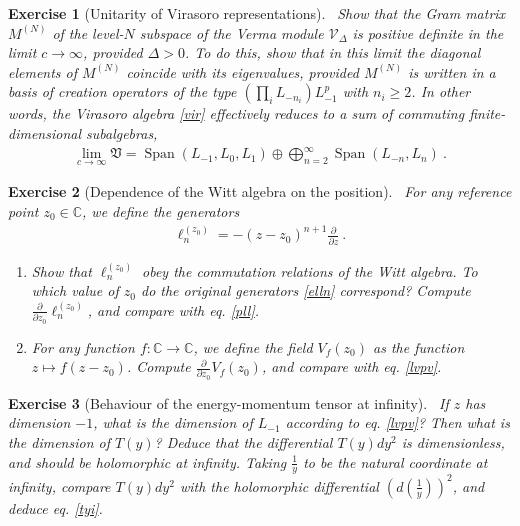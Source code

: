 \documentclass[12pt, a4paper, notitlepage, twoside]{report}
\numberwithin{equation}{section}
\theoremstyle{break}
\newtheorem{exo}{Exercise}[chapter]
\begin{document}
\begin{exo}[Unitarity of Virasoro representations]
~\label{exoun}
Show that the Gram matrix $M^{(N)}$ of the level-$N$ subspace of the Verma module $\mathcal{V}_\Delta$ is positive definite in the limit $c\to \infty$, provided  $\Delta >0$. 
To do this, show that in this limit the diagonal elements of $M^{(N)}$ coincide with its eigenvalues, provided $M^{(N)}$ is written in a basis of creation operators of the type $(\prod_i L_{-n_i}) L_{-1}^p$ with $n_i\geq 2$.
In other words, the Virasoro algebra \eqref{vir} effectively reduces to a sum of commuting finite-dimensional subalgebras, 
\begin{align}
 \underset{c\to \infty}{\lim} \mathfrak{V}  
=  \operatorname{Span}(L_{-1},L_0,L_1) \oplus \bigoplus_{n=2}^\infty \operatorname{Span} (L_{-n}, L_n)\ .
\end{align}
\end{exo}

\begin{exo}[Dependence of the Witt algebra on the position]
 ~\label{exowitt}
For any reference point $z_0\in\mathbb{C}$, we define the generators
\begin{align}
 \ell_n^{(z_0)} = -(z-z_0)^{n+1}{\frac{\partial}{\partial z}}\ .
\end{align}
\begin{enumerate}
 \item Show that $\ell_n^{(z_0)}$ obey the commutation relations of the Witt algebra. To which value of $z_0$ do the original generators \eqref{elln} correspond?
Compute $\frac{\partial}{\partial z_0} \ell_n^{(z_0)}$, and compare with eq. \eqref{pll}.
\item For any function $f:\mathbb{C}\to \mathbb{C}$, we define the field $V_f(z_0)$ as the function $z\mapsto f(z-z_0)$. Compute $\frac{\partial}{\partial z_0} V_f(z_0)$, and compare with eq. \eqref{lvpv}.
\end{enumerate}
\end{exo}

\begin{exo}[Behaviour of the energy-momentum tensor at infinity]
 ~\label{exoti}
 If $z$ has dimension $-1$, what is the dimension of $L_{-1}$ according to eq. \eqref{lvpv}? Then what is the dimension of $T(y)$? Deduce that the differential $T(y)dy^2$ is dimensionless, and should be holomorphic at infinity. Taking $\frac{1}{y}$ to be the natural coordinate at infinity, compare $T(y)dy^2$ with the holomorphic differential $\left(d(\frac{1}{y})\right)^2$, and deduce eq. \eqref{tyi}.
\end{exo}
\end{document}
